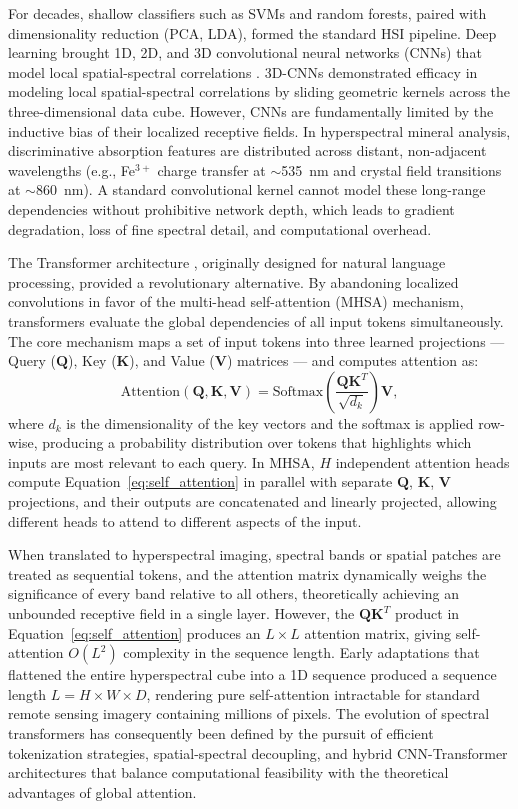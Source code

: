 \documentclass[11pt]{report}
\begin{document}
For decades, shallow classifiers such as SVMs and random forests, paired with dimensionality reduction (PCA, LDA), formed the standard HSI pipeline.
Deep learning brought 1D, 2D, and 3D convolutional neural networks (CNNs) that model local spatial-spectral correlations \cite{hong2021spectralformer}.
3D-CNNs demonstrated efficacy in modeling local spatial-spectral correlations by sliding geometric kernels across the three-dimensional data cube.
However, CNNs are fundamentally limited by the inductive bias of their localized receptive fields.
In hyperspectral mineral analysis, discriminative absorption features are distributed across distant, non-adjacent wavelengths (e.g., Fe$^{3+}$ charge transfer at $\sim$535~nm and crystal field transitions at $\sim$860~nm).
A standard convolutional kernel cannot model these long-range dependencies without prohibitive network depth, which leads to gradient degradation, loss of fine spectral detail, and computational overhead.

The Transformer architecture \cite{vaswani2017attention}, originally designed for natural language processing, provided a revolutionary alternative.
By abandoning localized convolutions in favor of the multi-head self-attention (MHSA) mechanism, transformers evaluate the global dependencies of all input tokens simultaneously.
The core mechanism maps a set of input tokens into three learned projections --- Query ($\mathbf{Q}$), Key ($\mathbf{K}$), and Value ($\mathbf{V}$) matrices --- and computes attention as:
\begin{equation}
\text{Attention}(\mathbf{Q}, \mathbf{K}, \mathbf{V}) = \text{Softmax}\!\left(\frac{\mathbf{Q}\mathbf{K}^T}{\sqrt{d_k}}\right)\mathbf{V},
\label{eq:self_attention}
\end{equation}
where $d_k$ is the dimensionality of the key vectors and the softmax is applied row-wise, producing a probability distribution over tokens that highlights which inputs are most relevant to each query. In MHSA, $H$ independent attention heads compute Equation~\ref{eq:self_attention} in parallel with separate $\mathbf{Q}$, $\mathbf{K}$, $\mathbf{V}$ projections, and their outputs are concatenated and linearly projected, allowing different heads to attend to different aspects of the input.

When translated to hyperspectral imaging, spectral bands or spatial patches are treated as sequential tokens, and the attention matrix dynamically weighs the significance of every band relative to all others, theoretically achieving an unbounded receptive field in a single layer.
However, the $\mathbf{Q}\mathbf{K}^T$ product in Equation~\ref{eq:self_attention} produces an $L \times L$ attention matrix, giving self-attention $O(L^2)$ complexity in the sequence length. Early adaptations that flattened the entire hyperspectral cube into a 1D sequence produced a sequence length $L = H \times W \times D$, rendering pure self-attention intractable for standard remote sensing imagery containing millions of pixels.
The evolution of spectral transformers has consequently been defined by the pursuit of efficient tokenization strategies, spatial-spectral decoupling, and hybrid CNN-Transformer architectures that balance computational feasibility with the theoretical advantages of global attention.
\end{document}
